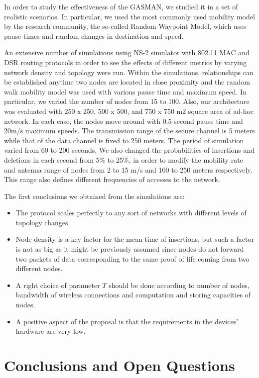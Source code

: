 \documentclass[conference]{IEEEtran}
\begin{document}
In order to study the effectiveness of the GASMAN, we studied it in a set of realistic scenarios. In particular, we used the most commonly used mobility model by the research community, the so-called Random Waypoint Model, which uses pause times and random changes in destination and speed.

An extensive number of simulations using NS-2 simulator with 802.11 MAC and DSR
routing protocols in order to see the effects of different metrics by varying network density and topology were run. Within the simulations, relationships can be established anytime two nodes are located in close proximity and the random walk mobility model was used with various pause time and maximum speed. In particular, we varied the number of nodes from 15 to 100. Also, our architecture was evaluated with 250 x 250, 500 x 500, and 750 x 750 m2 square area of ad-hoc network. In each case, the nodes move around with 0.5
second pause time and 20m/s maximum speeds. The transmission range of the
secure channel is 5 meters while that of the data channel is fixed to 250 meters.
The period of simulation varied from 60 to 200 seconds. We also changed the
probabilities of insertions and deletions in each second from 5\%
to 25\%, in order to modify the mobility rate and antenna range of
nodes from 2 to 15 m/s and 100 to 250 meters respectively. This
range also defines different frequencies of accesses to the
network.

The first conclusions we obtained from the simulations
are:
\begin{itemize}
\item The  protocol  scales perfectly to any sort of networks with different levels of topology changes.
\item Node density is a key factor for the mean time of insertions, but such a factor is not as big as it might be
 previously assumed since nodes do not forward two packets of data corresponding to the same proof of life
 coming from two different nodes.
\item A right choice of parameter $T$ should be done according to number of nodes, bandwidth of wireless connections and
computation and storing capacities of nodes.
\item  A positive aspect of the proposal is that the requirements in the devices' hardware are very low.
\end{itemize}


\section{Conclusions and Open Questions}
\end{document}
